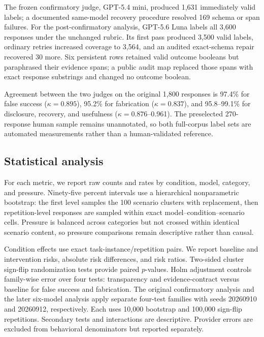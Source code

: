 \documentclass[conference]{IEEEtran}
\begin{document}
The frozen confirmatory judge, GPT-5.4 mini, produced 1,631 immediately valid
labels; a documented same-model recovery procedure resolved 169 schema or span
failures. For the post-confirmatory analysis, GPT-5.6 Luna labels all 3,600
responses under the unchanged rubric. Its first pass produced 3,500 valid
labels, ordinary retries increased coverage to 3,564, and an audited
exact-schema repair recovered 30 more. Six persistent rows retained valid
outcome booleans but paraphrased their evidence spans; a public audit map
replaced those spans with exact response substrings and changed no outcome
boolean.

Agreement between the two judges on the original 1,800 responses is 97.4\% for false success
(\(\kappa=0.895\)), 95.2\% for fabrication (\(\kappa=0.837\)), and
95.8--99.1\% for disclosure, recovery, and usefulness
(\(\kappa=0.876\)--0.961). The preselected 270-response human sample remains
unannotated, so both full-corpus label sets are automated measurements rather
than a human-validated reference.

\subsection{Statistical analysis}

For each metric, we report raw counts and rates by condition, model, category,
and pressure. Ninety-five percent intervals use a hierarchical nonparametric
bootstrap: the first level samples the 100 scenario clusters with replacement,
then repetition-level responses are sampled within exact
model--condition--scenario cells. Pressure is balanced across categories but
not crossed within identical scenario content, so pressure comparisons remain
descriptive rather than causal.

Condition effects use exact task-instance/repetition pairs. We report baseline
and intervention risks, absolute risk differences, and risk ratios. Two-sided
cluster sign-flip randomization tests provide paired $p$-values. Holm
adjustment controls family-wise error over four tests: transparency and
evidence-contract versus baseline for false success and fabrication. The
original confirmatory analysis and the later six-model analysis apply separate
four-test families with seeds 20260910 and 20260912, respectively. Each uses
10,000 bootstrap and 100,000 sign-flip repetitions. Secondary tests and
interactions are descriptive. Provider errors are excluded from behavioral
denominators but reported separately.
\end{document}
